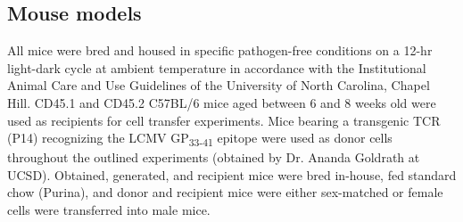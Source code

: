 %

\subsection{Mouse models}

All mice were bred and housed in specific pathogen-free conditions on a 12-hr light-dark cycle at ambient temperature in accordance with the Institutional Animal Care and Use Guidelines of the University of North Carolina, Chapel Hill. CD45.1 and CD45.2 C57BL/6 mice aged between 6 and 8 weeks old were used as recipients for cell transfer experiments. Mice bearing a transgenic TCR (P14) recognizing the LCMV GP\textsubscript{33-41} epitope were used as donor cells throughout the outlined experiments (obtained by Dr. Ananda Goldrath at UCSD). Obtained, generated, and recipient mice were bred in-house, fed standard chow (Purina), and donor and recipient mice were either sex-matched or female cells were transferred into male mice.

